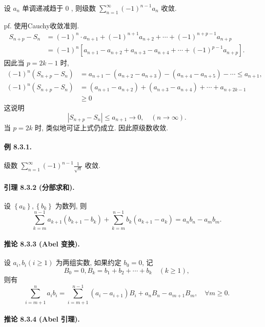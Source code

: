 设 $a_{n}$ 单调递减趋于 0 , 则级数 $\sum_{n=1}^{\infty}(-1)^{n-1}a_{n}$ 收敛.

pf. 使用Cauchy收敛准则.
\[
\begin{aligned}S_{n+p}-S_{n} & =(-1)^{n}\cdot a_{n+1}+(-1)^{n+1}a_{n+2}+\cdots+(-1)^{n+p-1}a_{n+p}\\
 & =(-1)^{n}\left[a_{n+1}-a_{n+2}+a_{n+3}-a_{n+4}+\cdots+(-1)^{p-1}a_{n+p}\right].
\end{aligned}
\]
因此当 $p=2k-1$ 时, 
\[
\begin{aligned}(-1)^{n}\left(S_{n+p}-S_{n}\right) & =a_{n+1}-\left(a_{n+2}-a_{n+3}\right)-\left(a_{n+4}-a_{n+5}\right)-\cdots\leqslant a_{n+1},\\
(-1)^{n}\left(S_{n+p}-S_{n}\right) & =\left(a_{n+1}-a_{n+2}\right)+\left(a_{n+3}-a_{n+4}\right)+\cdots+a_{n+2k-1}\\
 & \geqslant0
\end{aligned}
\]
这说明 
\[
\left|S_{n+p}-S_{n}\right|\leqslant a_{n+1}\rightarrow0,\quad(n\rightarrow\infty).
\]
当 $p=2k$ 时, 类似地可证上式仍成立. 因此原级数收敛.

\paragraph{例 8.3.1. }

级数 $\sum_{n=1}^{\infty}(-1)^{n-1}\frac{1}{\sqrt{n}}$ 收敛.

\paragraph{引理 8.3.2 (分部求和). }

设 $\left\{ a_{k}\right\} ,\left\{ b_{k}\right\} $ 为数列, 则 
\[
\sum_{k=m}^{n-1}a_{k+1}\left(b_{k+1}-b_{k}\right)+\sum_{k=m}^{n-1}b_{k}\left(a_{k+1}-a_{k}\right)=a_{n}b_{n}-a_{m}b_{m}.
\]


\paragraph{推论 8.3.3 (Abel 变换). }

设 $a_{i},b_{i}(i\geqslant1)$ 为两组实数, 如果约定 $b_{0}=0$, 记 
\[
B_{0}=0,B_{k}=b_{1}+b_{2}+\cdots+b_{k}\quad(k\geqslant1),
\]
则有 
\[
\sum_{i=m+1}^{n}a_{i}b_{i}=\sum_{i=m+1}^{n-1}\left(a_{i}-a_{i+1}\right)B_{i}+a_{n}B_{n}-a_{m+1}B_{m},\quad\forall m\geqslant0.
\]


\paragraph{推论 8.3.4 (Abel 引理). }


